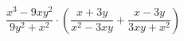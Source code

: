 \begin{ex}[type=simplify_calculate]
	\begin{condition}
		\( \dfrac{x^3-9xy^2}{9y^2+x^2}\cdot\left( \dfrac{x+3y}{x^2-3xy}+\dfrac{x-3y}{3xy+x^2}\right) \)
	\end{condition}
\end{ex}